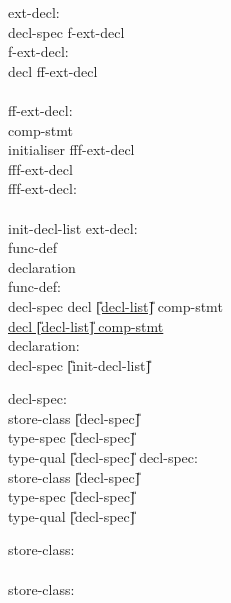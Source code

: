 \begin{center}

\PAIR
{
}
{
}

\PAIR
{
ext-decl:\\
\> decl-spec f-ext-decl \\
f-ext-decl: \\
\> 	decl ff-ext-decl \\
\>	\T{;} \\
ff-ext-decl: \\
\> 	comp-stmt \\
\>	\T{=} initialiser fff-ext-decl \\
\>	fff-ext-decl \\
fff-ext-decl: \\
\>	\T{;} \\
\>	\T{,} init-decl-list \T{;} 
}
{
ext-decl:\\
\> 	func-def \\
\> 	declaration \\ 
func-def: \\
\> decl-spec decl \underline{\U{[}decl-list\U{]}} comp-stmt \\
\> \underline{decl \U{[}decl-list\U{]} comp-stmt}  \\
declaration: \\
\> 	decl-spec \U{[}init-decl-list\U{]} \T{;}
}  	


\PAIR
{
decl-spec:\\
\>	store-class \U{[}decl-spec\U{]} \\
\>	type-spec  \U{[}decl-spec\U{]} \\
\> 	type-qual  \U{[}decl-spec\U{]} 
} 
{
decl-spec:\\
\>	store-class \U{[}decl-spec\U{]} \\
\>	type-spec \U{[}decl-spec\U{]} \\
\>	type-qual \U{[}decl-spec\U{]}
}

\PAIR
{
store-class:   \\
\>	   \\
\>	  
}
{
store-class:   \\
\>	   \\
\>	  
}



\end{center}
